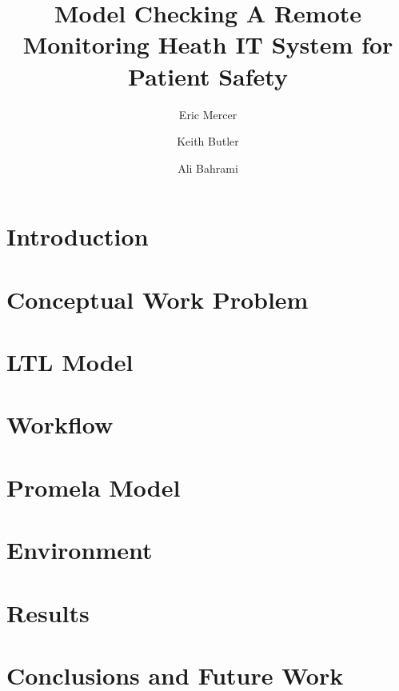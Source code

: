 \documentclass{llncs}
\begin{document}
\title{
  Model Checking A Remote Monitoring Heath IT System for Patient Safety
}

\author{
Eric Mercer
\and
Keith Butler 
\and
Ali Bahrami
}



\maketitle

\begin{abstract}

\end{abstract}

\section{Introduction}


\section{Conceptual Work Problem}


\section{LTL Model}


\section{Workflow}


\section{Promela Model}
\label{sec:bpmn}


\section{Environment}
\label{sec:env}


\section{Results}


\section{Conclusions and Future Work}


\clearpage


\end{document}

